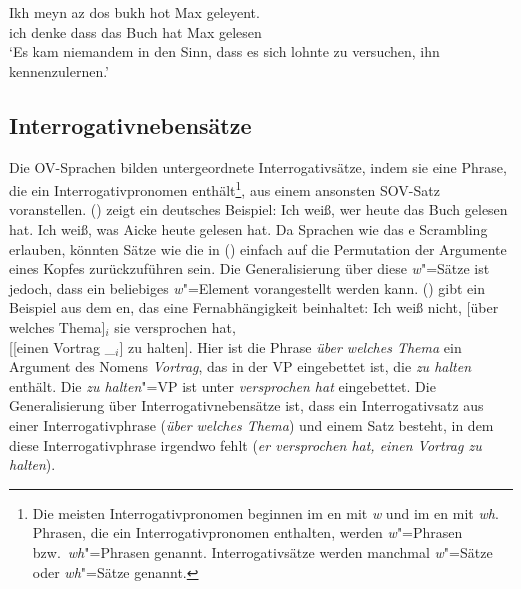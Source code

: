 \ex%
\gll Ikh meyn  az   dos bukh hot Max geleyent.\\
     ich denke dass das Buch hat Max gelesen\\

\zl
\ea
{}
\glt `Es kam niemandem in den Sinn, dass es sich lohnte zu versuchen, ihn kennenzulernen.'
\z

\subsection{Interrogativnebensätze}

Die OV-Sprachen bilden untergeordnete Interrogativsätze, indem sie eine Phrase, die ein
Interrogativpronomen enthält\footnote{
Die meisten Interrogativpronomen beginnen im en mit \emph{w} und im en mit \emph{wh}. Phrasen,
die ein Interrogativpronomen enthalten, werden \emph{w}"=Phrasen bzw.\ \emph{wh}"=Phrasen
genannt. Interrogativsätze werden manchmal \emph{w}"=Sätze oder \emph{wh}"=Sätze genannt.
}, aus einem
ansonsten SOV-Satz voranstellen. () zeigt ein deutsches Beispiel:
\eal
\ex
Ich weiß, wer heute das Buch gelesen hat.\german
\ex
Ich weiß, was Aicke heute gelesen hat.
\zl
Da Sprachen wie das e Scrambling erlauben, könnten Sätze wie die in () einfach auf
die Permutation der Argumente eines Kopfes zurückzuführen sein. Die Generalisierung über diese \emph{w}"=Sätze
ist jedoch, dass ein beliebiges \emph{w}"=Element vorangestellt werden kann. () gibt ein Beispiel aus dem en, das
eine Fernabhängigkeit beinhaltet:
\ea
Ich weiß nicht, [über welches Thema]$_i$ sie versprochen hat,\\ \hfill{}[[einen Vortrag \_$_i$] zu halten].\german
\z
Hier ist die Phrase \emph{über welches Thema} ein Argument des Nomens \emph{Vortrag},
das in der VP eingebettet ist, die \emph{zu halten} enthält. Die \emph{zu halten}"=VP ist unter
\emph{versprochen hat} eingebettet. Die Generalisierung über Interrogativnebensätze ist, dass ein
Interrogativsatz aus einer Interrogativphrase (\emph{über welches Thema})
und einem Satz besteht, in dem diese Interrogativphrase irgendwo fehlt (\emph{er versprochen
  hat, einen Vortrag zu halten}).

